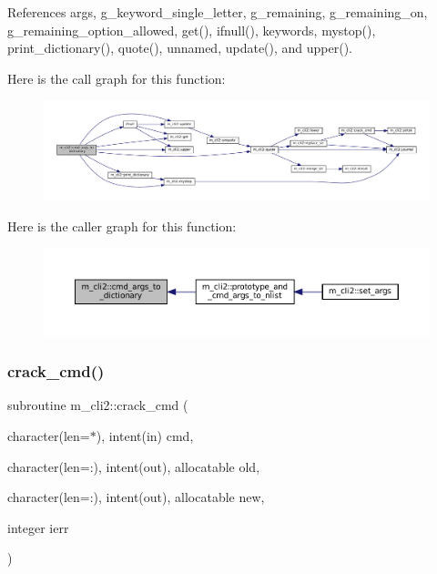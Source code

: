 References args, g\+\_\+keyword\+\_\+single\+\_\+letter, g\+\_\+remaining, g\+\_\+remaining\+\_\+on, g\+\_\+remaining\+\_\+option\+\_\+allowed, get(), ifnull(), keywords, mystop(), print\+\_\+dictionary(), quote(), unnamed, update(), and upper().

Here is the call graph for this function\+:
\nopagebreak
\begin{figure}[H]
\begin{center}
\leavevmode
\includegraphics[width=350pt]{namespacem__cli2_a3348b0c76dadd62c536e06f82bcb0331_cgraph}
\end{center}
\end{figure}
Here is the caller graph for this function\+:
\nopagebreak
\begin{figure}[H]
\begin{center}
\leavevmode
\includegraphics[width=350pt]{namespacem__cli2_a3348b0c76dadd62c536e06f82bcb0331_icgraph}
\end{center}
\end{figure}
\mbox{\label{namespacem__cli2_a710b26995119aee101959555b1bac8e2}} 
\subsubsection{\texorpdfstring{crack\+\_\+cmd()}{crack\_cmd()}}
{\footnotesize\ttfamily subroutine m\+\_\+cli2\+::crack\+\_\+cmd (\begin{DoxyParamCaption}\item[{character(len=$\ast$), intent(in)}]{cmd,  }\item[{character(len=\+:), intent(out), allocatable}]{old,  }\item[{character(len=\+:), intent(out), allocatable}]{new,  }\item[{integer}]{ierr }\end{DoxyParamCaption})\hspace{0.3cm}{\ttfamily [private]}}



